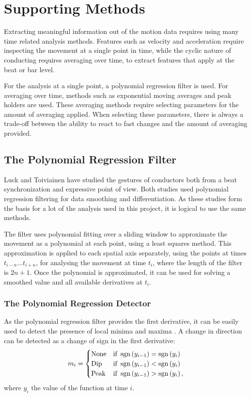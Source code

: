 \section{Supporting Methods}

Extracting meaningful information out of the motion data
requires using many time related analysis methods.
Features such as velocity and acceleration
require inspecting the movement at a single point in time,
while the cyclic nature of conducting requires
averaging over time, to extract features that apply
at the beat or bar level.

For the analysis at a single point,
a polynomial regression filter is used.
For averaging over time, methods such as
exponential moving averages and peak holders are used.
These averaging methods require selecting 
parameters for the amount of averaging applied.
When selecting these parameters,
there is always a trade-off between the 
ability to react to fast changes
and the amount of averaging provided.

\subsection{The Polynomial Regression Filter}

Luck and Toiviainen have studied the gestures of conductors
both from a beat synchronization \cite{luck2006}
and expressive \cite{luck2010} point of view.
Both studies used polynomial regression filtering
for data smoothing and differentiation.
As these studies form the basis for a lot
of the analysis used in this project,
it is logical to use the same methods.

The filter uses polynomial fitting
over a sliding window to approximate the movement
as a polynomial at each point,
using a least squares method.
This approximation is applied to each spatial axis separately,
using the points at times $t_{i-n} \ldots t_{i+n}$,
for analysing the movement at time $t_i$,
where the length of the filter is $2n + 1$.
Once the polynomial is approximated,
it can be used for solving a smoothed value and
all available derivatives at $t_i$.

\subsubsection*{The Polynomial Regression Detector}

As the polynomial regression filter provides the first derivative,
it can be easily used to detect the presence of local minima and maxima
.
A change in direction can be detected as a change of sign in the first derivative:
\begin{equation}
m_i =
\begin{cases}
\mathrm{None} & \text{if } \operatorname{sgn} \left( y_{i-1} \right) = \operatorname{sgn} \left( y_{i} \right) \\
\mathrm{Dip} & \text{if } \operatorname{sgn} \left( y_{i-1} \right) < \operatorname{sgn} \left( y_{i} \right) \\
\mathrm{Peak} & \text{if } \operatorname{sgn} \left( y_{i-1} \right) > \operatorname{sgn} \left( y_{i} \right) ,
\end{cases}
\end{equation}
where $y_i$ the value of the function at time $i$.

